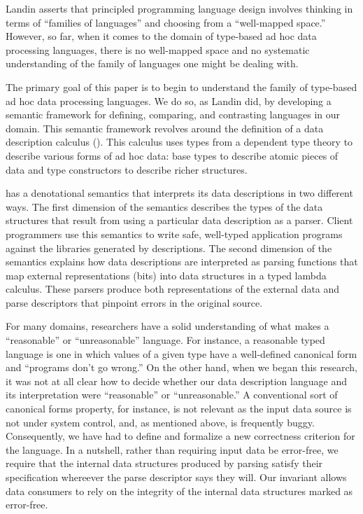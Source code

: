 Landin asserts that principled programming language design
involves thinking in terms of ``families of languages'' and
choosing from a ``well-mapped space.''  However, so far,
when it comes to the domain of type-based ad hoc data processing languages, 
there is no well-mapped space and no systematic understanding
of the family of languages one might be dealing with.

The primary goal of this paper is to begin to understand the
family of type-based ad hoc data processing languages.  We do so,
as Landin did, by developing a semantic
framework for defining, comparing, and contrasting languages
in our domain.  This semantic framework revolves around the
definition of a data description calculus (\ddc{}).  
This calculus uses types from a dependent type theory to describe
various forms of ad hoc data:
base types to describe atomic pieces of data and
type constructors to describe richer structures.

\ddc{} has a denotational semantics
that interprets its data descriptions in two different
ways.  The first dimension of the semantics describes the
types of the data structures that result from using a particular
data description as a parser.  Client programmers use this semantics to
write safe, well-typed application programs against the libraries
generated by \ddc{} descriptions.  The second dimension of the semantics
explains how data descriptions are
interpreted as parsing functions that map external representations (bits)
into data structures in a typed lambda calculus.  These parsers produce both 
representations of the external data and
parse descriptors that pinpoint errors in the original source.



For many domains, researchers have a solid understanding of
what makes a ``reasonable'' or ``unreasonable'' language.  For instance,
a reasonable typed language is one in which values of a given type
have a well-defined canonical form and ``programs don't go wrong.''
On the other hand, when we began this research, it
was not at all clear
how to decide whether our data description language and
its interpretation were ``reasonable'' or ``unreasonable.''  
A conventional sort
of canonical forms property, for instance, 
is not relevant as the input data source
is not under system control, and, as
mentioned above, is frequently buggy.  Consequently,
we have had to define and formalize a new correctness criterion 
for the language. 
In a nutshell, rather than requiring input data be error-free, we require
that the internal data structures produced by parsing 
satisfy their specification whereever the parse descriptor says they
will.  Our invariant allows
data consumers to rely on the integrity of the internal data structures
marked as error-free. 

